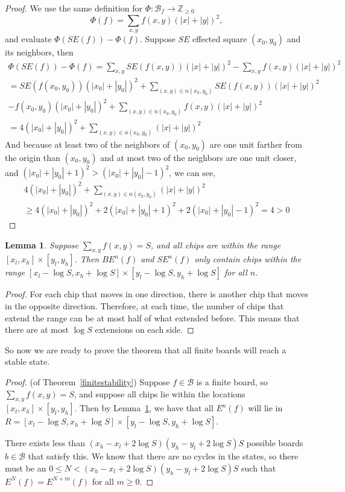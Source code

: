 \documentclass[11pt]{article}
\newtheorem{lemma}{Lemma}
\begin{document}
\begin{proof}
We use the same definition for $\Phi: \mathcal{B}_f \rightarrow \mathbb{Z}_{\geq 0}$ 
\[ \Phi(f) = \sum_{x,y} f(x,y)(|x|+|y|)^2, \]
and evaluate $\Phi(SE(f)) - \Phi(f)$. Suppose $SE$ effected square $(x_0,y_0)$ and its neighbors, then
\begin{align}
\Phi(SE(f)) - \Phi(f) =\sum_{x,y} SE(f(x,y))(|x|+|y|)^2 - \sum_{x,y} f(x,y)(|x|+|y|)^2 \\
= SE(f(x_0,y_0))(|x_0|+|y_0|)^2 + \sum_{(x,y) \in n(x_0,y_0)} SE(f(x,y))(|x|+|y|)^2 \\- f(x_0,y_0)(|x_0|+|y_0|)^2 + \sum_{(x,y) \in n(x_0,y_0)} f(x,y)(|x|+|y|)^2 \\
= 4(|x_0| + |y_0|)^2 +\sum_{(x,y) \in n(x_0, y_0)} (|x| + |y|)^2
\end{align}
And because at least two of the neighbors of $(x_0, y_0)$ are one unit farther from the origin than $(x_0, y_0)$ and at most two of the neighbors are one unit closer, and $(|x_0|+|y_0| +1)^2 > (|x_0|+|y_0| - 1)^2$, we can see,
\begin{align}
4(|x_0| + |y_0|)^2 +\sum_{(x,y) \in n(x_0, y_0)} (|x| + |y|)^2  \\ 
\geq 4(|x_0| + |y_0|)^2 + 2 (|x_0| + |y_0|+1)^2 + 2 (|x_0| + |y_0|-1)^2 = 4 >0
\end{align}
\end{proof}


\begin{lemma}
\label{finiteextension}
Suppose $\sum_{x,y} f(x,y) = S$, and all chips are within the range $[x_l, x_h] \times [y_l, y_h]$. Then $BE^n(f)$ and $SE^n(f)$ only contain chips within the range $[x_l - \log S, x_h + \log S] \times [y_l-\log S, y_h+\log S]$ for all $n$.
\end{lemma}

\begin{proof}
For each chip that moves in one direction, there is another chip that moves in the opposite direction. Therefore, at each time, the number of chips that extend the range can be at most half of what extended before. This means that there are at most $\log S$ extensions on each side. 
\end{proof}

So now we are ready to prove the theorem that all finite boards will reach a stable state. 

\begin{proof}
(of Theorem~\ref{finitestability}) Suppose $f \in \mathcal{B}$ is a finite board, so $\sum_{x,y} f(x,y) = S$, and suppose all chips lie within the locations $[x_l, x_h] \times [y_l, y_h]$. Then by Lemma~\ref{finiteextension}, we have that all $E^n(f)$ will lie in $R = [x_l - \log S, x_h + \log S] \times [y_l - \log S, y_h + \log S]$. 

There exists less than $(x_h - x_l + 2\log S)(y_h - y_l + 2\log S)S$ possible boards $b \in \mathcal{B}$ that satisfy this. We know that there are no cycles in the states, so there must be an $0 \leq N < (x_h - x_l + 2\log S)(y_h - y_l + 2\log S)S$ such that $E^N(f) = E^{N+m}(f)$ for all $m \geq 0$.
\end{proof}
\end{document}

